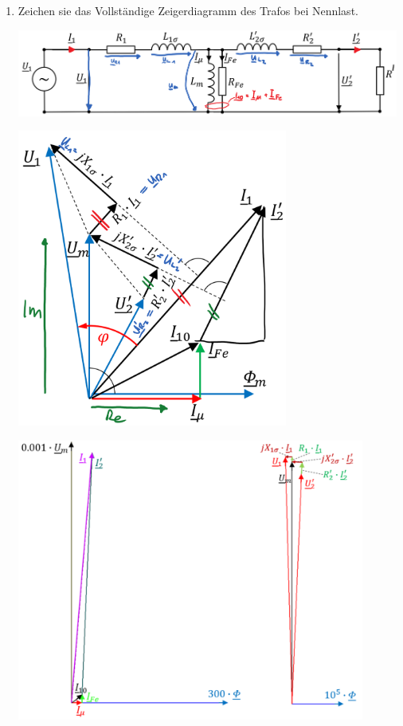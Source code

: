 \begin{enumerate}
\newpage
\item Zeichen sie das Vollständige Zeigerdiagramm des Trafos bei Nennlast.

\includegraphics[width=0.99\textwidth]{bilder/a52.png}

\begin{minipage}{0.49\textwidth}
\includegraphics[width=0.7\textwidth]{bilder/a53.png}
\end{minipage}
\begin{minipage}{0.49\textwidth}
\includegraphics[width=0.9\textwidth]{bilder/a5.png}
\end{minipage}

\end{enumerate}


